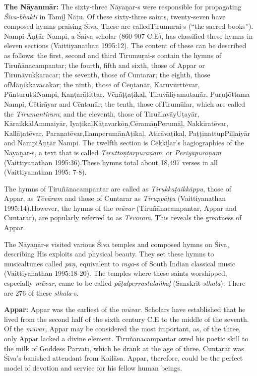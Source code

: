 \textbf{The Nāyanmār:} The sixty-three Nāyaṉar-s were responsible for propagating \textit{Śiva-bhakti} in Tamiḻ Nāṭu. Of these sixty-three saints, twenty-seven have composed hymns praising Śiva. These are called\break Tirumuṟai-s (“the sacred books”). Nampi Āṇṭār Nampi, a Śaiva scholar (860-907 C.E), has classified these hymns in eleven sections (Vaittiya\-nathan 1995:12). The content of these can be described as follows: the first, second and third Tirumuṟai-s contain the hymns of Tiruñānacampantar; the fourth, fifth and sixth, those of Appar or Tirunāvu\-kkaracar; the seventh, those of Cuntarar; the eighth, those of\break Māṇikkavācakar; the ninth, those of Cēṇtanār, Karuvūrttēvar, PūnturuttiNampi, Kaṇṭarātittar, Vēṇāṭṭaṭikaḷ, Tiruvāliyamutaṉār, Puruṭōttama Nampi, Cētirāyar and Cēntanār; the tenth, those of\break Tirumūlar, which are called the \textit{Tirumantiram}; and the eleventh, those of TiruālavāyUṭayār, KāraikkālAmmaiyār, IyaṭikaḷKāṭavarkōṉ,\break CēramāṉPerumāḷ, Nakkīratēvar, Kallāṭatēvar, Paraṇatēvar,\break IḷamperumāṉAṭikaḷ, Atirāvaṭikaḷ, PaṭṭiṇattupPiḷḷaiyār and Nampi\break Āṇṭār Nampi. The twelfth section is Cēkkiḻar’s hagiographies of the Nāyaṉār-s, a text that is called \textit{Tiruttoṇṭarpurāṇam}, or \textit{Periyapurāṇam} (Vaittiyanathan 1995:36).These hymns total about 18,497 verses in all (Vaittiyanathan 1995: 7-8).

The hymns of Tiruñānacampantar are called as \textit{Tirukkaṭaikkāppu}, those of Appar, as \textit{Tēvāram} and those of Cuntarar as \textit{Tiruppāṭṭu }(Vaittiya\-nathan 1995:14).However, the hymns of the \textit{mūvar} (Tiruñānacampantar, Appar and Cuntarar), are popularly referred to as \textit{Tēvāram}. This reveals the greatness of Appar.

The Nāyaṉār-s visited various Śiva temples and composed hymns on Śiva, describing His exploits and physical beauty. They set these hymns to musicaltunes called \textit{paṇ}, equivalent to \textit{raga}-s of South Indian classical music (Vaittiyanathan 1995:18-20). The temples where these saints worshipped, especially \textit{mūvar}, came to be called \textit{pāṭalpeṟṟastalaṅkaḷ} (Sanskrit \textit{sthala}). There are 276 of these \textit{sthala}-s.

\textbf{Appar:} Appar was the earliest of the \textit{mūvar}. Scholars have established that he lived from the second half of the sixth century C.E to the middle of the seventh. Of the \textit{mūvar, }Appar may be considered the most important, as, of the three, only Appar lacked a divine element. Tiruñānacampantar owed his poetic skill to the milk of Goddess Pārvatī, which he drank at the age of three. Cuntarar was Śiva’s banished attendant from Kailāsa. Appar, therefore, could be the perfect model of devotion and service for his fellow human beings.


